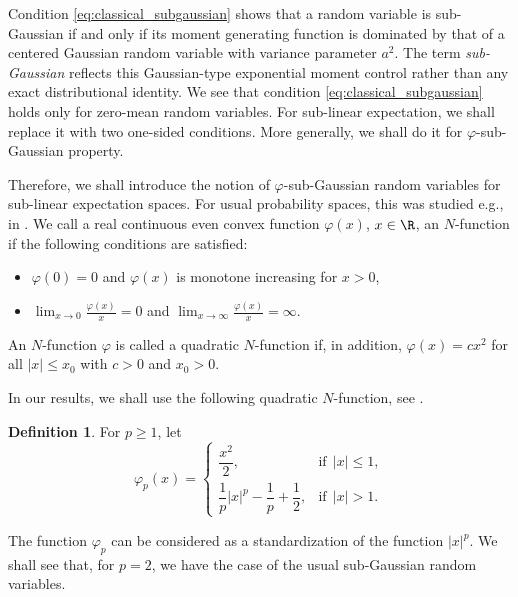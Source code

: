 \documentclass[12pt]{article}
\theoremstyle{definition}
\newtheorem{definition}[theorem]{Definition}
\theoremstyle{remark}
\numberwithin{equation}{section}
\begin{document}
Condition \eqref{eq:classical_subgaussian} shows that a random variable is
sub-Gaussian if and only if its moment generating function is dominated by that
of a centered Gaussian random variable with variance parameter $a^2$. 
The term \emph{sub-Gaussian} reflects this Gaussian-type exponential moment control rather
than any exact distributional identity.
We see that condition \eqref{eq:classical_subgaussian} holds only for zero-mean random variables.
For sub-linear expectation, we shall replace it with two one-sided conditions.
More generally, we shall do it for $\varphi$-sub-Gaussian property.



Therefore, we shall introduce the notion of $\varphi$-sub-Gaussian random variables for sub-linear expectation spaces.
For usual probability spaces, this was studied e.g., in \cite{Zajkowski2021}.
We call a real continuous even convex function $\varphi(x)$, $x \in \R$, an
$N$-function if the following conditions are satisfied:
\begin{itemize}
\item[(a)] $\varphi(0) = 0$ and $\varphi(x)$ is monotone increasing for $x > 0$,
\item[(b)] $\lim_{x \to 0} \frac{\varphi(x)}{x} = 0$ and
$\lim_{x \to \infty} \frac{\varphi(x)}{x} = \infty$.
\end{itemize}

An $N$-function $\varphi$ is called a quadratic $N$-function if, in addition,
$\varphi(x) = c x^2$ for all $|x| \le x_0$ with $c > 0$ and $x_0 > 0$.

In our results, we shall use the following quadratic $N$-function, see \cite{Zajkowski2021}.
\begin{definition} 
For $p \ge 1$, let
\[
\varphi_p(x) =
\begin{cases}
\dfrac{x^2}{2}, &   \text{if} \ \ |x| \le 1, \\[2ex]
\dfrac{1}{p}|x|^p - \dfrac{1}{p} + \dfrac{1}{2}, & \text{if} \ \ |x| > 1.
\end{cases}
\]
\end{definition}
The function $\varphi_p$ can be considered as a standardization of the function $|x|^p$.
We shall see that, for $p = 2$, we have the case of the usual sub-Gaussian random variables.
\end{document}
